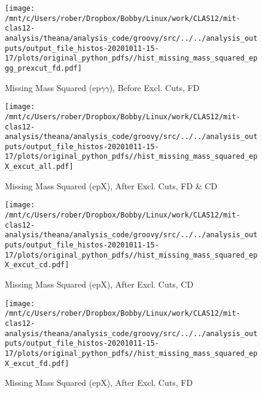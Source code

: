 \documentclass{article}
\begin{document}
\begin{landscape}
    \begin{figure}[h]
        \centering

        \texttt{[image: /mnt/c/Users/rober/Dropbox/Bobby/Linux/work/CLAS12/mit-clas12-analysis/theana/analysis\_code/groovy/src/../../analysis\_outputs/output\_file\_histos-20201011-15-17/plots/original\_python\_pdfs//hist\_missing\_mass\_squared\_epgg\_prexcut\_fd.pdf]}
        \captionsetup{textformat=empty,labelformat=blank}
        \caption{Missing Mass Squared (ep$\gamma$$\gamma$), Before Excl. Cuts, FD}
    \end{figure}
    \clearpage
    
    \begin{figure}[h]
        \centering

        \texttt{[image: /mnt/c/Users/rober/Dropbox/Bobby/Linux/work/CLAS12/mit-clas12-analysis/theana/analysis\_code/groovy/src/../../analysis\_outputs/output\_file\_histos-20201011-15-17/plots/original\_python\_pdfs//hist\_missing\_mass\_squared\_epX\_excut\_all.pdf]}
        \captionsetup{textformat=empty,labelformat=blank}
        \caption{Missing Mass Squared (epX), After Excl. Cuts, FD \& CD}
    \end{figure}
    \clearpage
    
    \begin{figure}[h]
        \centering

        \texttt{[image: /mnt/c/Users/rober/Dropbox/Bobby/Linux/work/CLAS12/mit-clas12-analysis/theana/analysis\_code/groovy/src/../../analysis\_outputs/output\_file\_histos-20201011-15-17/plots/original\_python\_pdfs//hist\_missing\_mass\_squared\_epX\_excut\_cd.pdf]}
        \captionsetup{textformat=empty,labelformat=blank}
        \caption{Missing Mass Squared (epX), After Excl. Cuts, CD}
    \end{figure}
    \clearpage
    
    \begin{figure}[h]
        \centering

        \texttt{[image: /mnt/c/Users/rober/Dropbox/Bobby/Linux/work/CLAS12/mit-clas12-analysis/theana/analysis\_code/groovy/src/../../analysis\_outputs/output\_file\_histos-20201011-15-17/plots/original\_python\_pdfs//hist\_missing\_mass\_squared\_epX\_excut\_fd.pdf]}
        \captionsetup{textformat=empty,labelformat=blank}
        \caption{Missing Mass Squared (epX), After Excl. Cuts, FD}
    \end{figure}
    \clearpage
    
    \begin{figure}[h]
        \centering


\end{figure}
\end{landscape}
\end{document}
